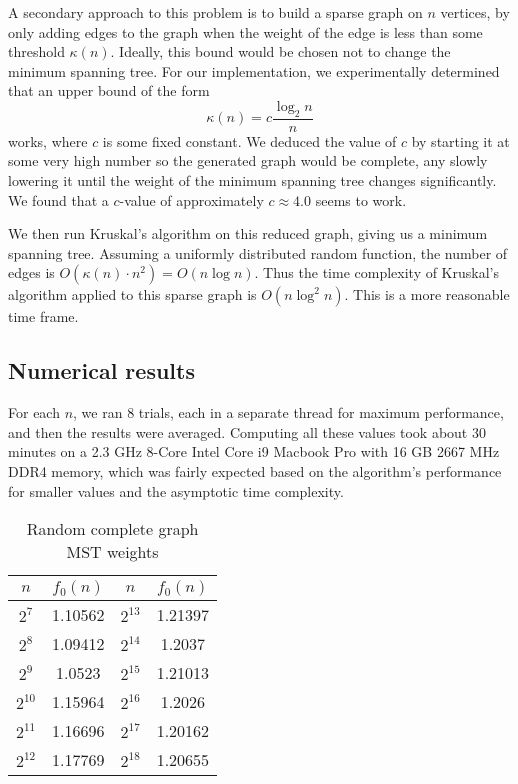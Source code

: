 \documentclass[a4paper, 10pt, twocolumn, twoside]{article}
\begin{document}
A secondary approach to this problem is to build a sparse graph on $n$ vertices, by only adding edges to the graph when the weight of the edge is less than some threshold $\kappa(n)$. Ideally, this bound would be chosen not to change the minimum spanning tree. For our implementation, we experimentally determined that an upper bound of the form
\[
    \kappa(n)=c\frac{\log_2 n}{n}
\]
works, where $c$ is some fixed constant. We deduced the value of $c$ by starting it at some very high number so the generated graph would be complete, any slowly lowering it until the weight of the minimum spanning tree changes significantly. We found that a $c$-value of approximately $c\approx 4.0$ seems to work.

We then run Kruskal's algorithm on this reduced graph, giving us a minimum spanning tree. Assuming a uniformly distributed random function, the number of edges is $O(\kappa(n)\cdot n^2)=O(n\log n)$. Thus the time complexity of Kruskal's algorithm applied to this sparse graph is $O(n\log^2 n)$. This is a more reasonable time frame. 

\subsection{Numerical results}

For each $n$, we ran $8$ trials, each in a separate thread for maximum performance, and then the results were averaged. Computing all these values took about 30 minutes on a 2.3 GHz 8-Core Intel Core i9 Macbook Pro
with 16 GB 2667 MHz DDR4 memory, which was fairly expected based on the algorithm's performance for smaller values and the asymptotic time complexity.

\renewcommand{\arraystretch}{1.5}
\begin{table}[htbp]
\centering
\caption{Random complete graph MST weights}
\begin{tabular}{||c|c||c|c||}
\hline
$n$ & $f_0(n)$ & $n$ & $f_0(n)$ \\
\hline
$2^7$ &1.10562 & $2^{13}$  &1.21397\\
$2^8$	&1.09412 & $2^{14}$  &1.2037\\
$2^9$&1.0523 &$2^{15}$  &1.21013\\
$2^{10}$ &1.15964 &$2^{16}$  &1.2026\\
$2^{11}$  &1.16696 & $2^{17}$  &1.20162\\
$2^{12}$  &1.17769 & $2^{18}$  &1.20655\\
\hline
\end{tabular}
\end{table}
\end{document}
